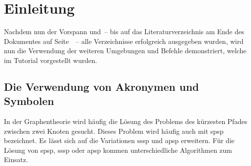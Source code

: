 \documentclass[english,ngerman]{tudscrreprt}
\newcommand*{\newformulasymbol}[5][]{%
  \newglossaryentry{#2}{%
    type=symbols,%
    name={#3},%
    description={\nopostdesc},%
    symbol={\ensuremath{#4}},%
    user1={\ensuremath{\mathrm{#5}}},%
    sort={#2},%
    #1%
  }%
}
\begin{document}
\declaration[company=FIRMA]

\tableofcontents
\listoffigures
\listoftables

\printacronyms[style=acrotabu]
\printsymbols[style=symblongtabu]

\chapter{Einleitung}
Nachdem nun der Vorspann und~-- bis auf das Literaturverzeichnis am
Ende des Dokumentes auf Seite~\pageref{sec:bibliography}~-- alle
Verzeichnisse erfolgreich ausgegeben wurden, wird nun die Verwendung
der weiteren Umgebungen und Befehle demonstriert, welche im Tutorial
 vorgestellt wurden.

\section{Die Verwendung von Akronymen und Symbolen}

In der Graphentheorie wird häufig die Lösung des Problems des kürzesten
Pfades zwischen zwei Knoten gesucht. Dieses Problem wird häufig auch
mit \gls{spsp} bezeichnet. Es lässt sich auf die Variationen \gls{sssp}
und \gls{apsp} erweitern. Für die Lösung von \gls{spsp}, \gls{sssp}
oder \gls{apsp} kommen unterschiedliche Algorithmen zum Einsatz.


\makeatletter
\newcommand*\sort@index[2]{%
  \begingroup%
    \def\@tempa##1##2\@nil{\def\@tempb{##1}}%
    \@tempa#2\@nil%
    \@tempswafalse%
    \@tempcnta=0%
    \def\@tempa##1{%
      \if@tempswa\else\advance\@tempcnta\@ne\fi%
      \def\@tempc{##1}%
      \ifx\@tempb\@tempc\@tempswatrue\fi%
    }%
    \forcsvlist{\@tempa}{%
      A,B,C,D,E,F,G,H,I,J,K,L,M,N,O,P,Q,R,S,T,U,V,W,X,Y,Z,%
      a,b,c,d,e,f,g,h,i,j,k,l,m,n,o,p,q,r,s,t,u,v,w,x,y,z,ß,%
      \Alpha,\Beta,\Gamma,\Delta,\Epsilon,\Zeta,\Eta,\Theta,\Iota,%
      \Kappa,\Lambda,\Mu,\Nu,\Xi,\Omicron,\Pi,\Rho,\Sigma,\Tau,\Upsilon,%
      \Phi,\Chi,\Psi,\Omega,%
      \alpha,\beta,\varbeta,\gamma,\delta,\epsilon,\varepsilon,\zeta,%
      \eta,\theta,\vartheta,\iota,\kappa,\varkappa,\lambda,\mu,\nu,%
      \xi,\omicron,\pi,\varpi,\rho,\varrho,\sigma,\varsigma,\tau,%
      \upsilon,\phi,\varphi,\chi,\psi,\omega%
    }%
    \edef\@tempa{%
      \endgroup%
      \unexpanded{\def#1}{%
        \ifnum\@tempcnta<100 0\fi\ifnum\@tempcnta<10 0\fi\the\@tempcnta%
        \detokenize{#2}%
      }%
    }%
  \@tempa%
}
\newcommand*{\newformulasymbol}[5][]{%
  \begingroup%
    \def\@tempa{%
      type=symbols,%
      name={#3},%
      description={\nopostdesc},%
      symbol={\ensuremath{#4}},%
      user1={\ensuremath{\mathrm{#5}}},%
      #1%
    }%
    \sort@index\@tempb{#4}%
    \epreto\@tempa{sort=\@tempb,}%
    \edef\@tempb{%
      \endgroup%
      \unexpanded{\newglossaryentry{#2}}{\expandonce\@tempa}%
    }%
  \@tempb%
}
\makeatother
\end{document}
